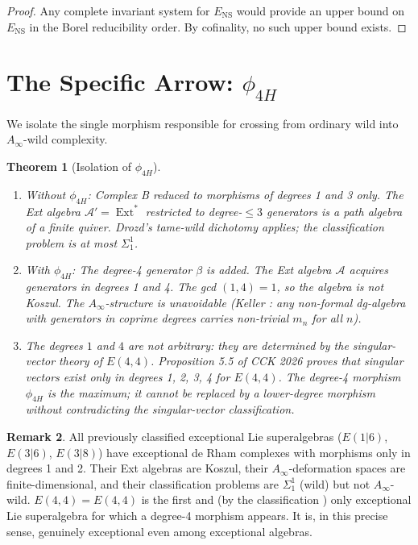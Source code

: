 \documentclass[reqno,10pt]{amsart}
\theoremstyle{plain}
\newtheorem{theorem}{Theorem}[section]
\theoremstyle{definition}
\newtheorem{remark}[theorem]{Remark}
\def\Ext{\operatorname{Ext}}
\def\gE{E(4,4)}
\begin{document}
\begin{proof}
  Any complete invariant system for $E_\mathrm{NS}$ would provide an upper
  bound on $E_\mathrm{NS}$ in the Borel reducibility order.  By cofinality,
  no such upper bound exists.
\end{proof}

\section{The Specific Arrow: $\phi_{4H}$}\label{sec:phi4H}

We isolate the single morphism responsible for crossing from ordinary wild
into $A_\infty$-wild complexity.

\begin{theorem}[Isolation of $\phi_{4H}$]\label{thm:isolation}
  \begin{enumerate}
    \item[\rm(i)] \emph{Without $\phi_{4H}$}: Complex B reduced to morphisms
          of degrees 1 and 3 only.  The Ext algebra $\mathcal{A}' = \Ext^*$
          restricted to degree-$\leq 3$ generators is a path algebra of a
          finite quiver.  Drozd's tame-wild dichotomy applies; the
          classification problem is at most $\Sigma_1^1$.
    \item[\rm(ii)] \emph{With $\phi_{4H}$}: The degree-4 generator $\beta$
          is added.  The Ext algebra $\mathcal{A}$ acquires generators in
          degrees 1 and 4.  The gcd $(1,4) = 1$, so the algebra is not
          Koszul.  The $A_\infty$-structure is unavoidable (Keller
          \cite{Keller2001}: any non-formal dg-algebra with generators
          in coprime degrees carries non-trivial $m_n$ for all $n$).
    \item[\rm(iii)] The degrees $1$ and $4$ are not arbitrary: they are
          determined by the singular-vector theory of $\gE$.
          Proposition 5.5 of CCK 2026 \cite{CCK2026} proves that singular
          vectors exist only in degrees 1, 2, 3, 4 for $\gE$.  The
          degree-4 morphism $\phi_{4H}$ is the maximum; it cannot be
          replaced by a lower-degree morphism without contradicting the
          singular-vector classification.
  \end{enumerate}
\end{theorem}

\begin{remark}
  All previously classified exceptional Lie superalgebras ($E(1|6)$,
  $E(3|6)$, $E(3|8)$) have exceptional de Rham complexes with morphisms
  only in degrees 1 and 2.  Their Ext algebras are Koszul, their
  $A_\infty$-deformation spaces are finite-dimensional, and their
  classification problems are $\Sigma_1^1$ (wild) but not $A_\infty$-wild.
  $\gE = E(4,4)$ is the first and (by the classification \cite{CCK2026})
  only exceptional Lie superalgebra for which a degree-4 morphism appears.
  It is, in this precise sense, genuinely exceptional even among
  exceptional algebras.
\end{remark}
\end{document}
